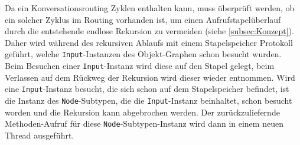 Da ein Konversationsrouting Zyklen enthalten kann, muss überprüft werden, ob ein solcher Zyklus im Routing vorhanden ist, um einen Aufrufstapelüberlauf durch die entstehende endlose Rekursion zu vermeiden (siehe \ref{subsec:Konzept}). Daher wird während des rekursiven Ablaufs mit einem Stapelspeicher Protokoll geführt, welche \texttt{Input}-Instanzen des Objekt-Graphen schon besucht wurden. Beim Besuchen einer \texttt{Input}-Instanz wird diese auf den Stapel gelegt, beim Verlassen auf dem Rückweg der Rekursion wird dieser wieder entnommen. Wird eine \texttt{Input}-Instanz besucht, die sich schon auf dem Stapelspeicher befindet, ist die Instanz des \texttt{Node}-Subtypen, die die \texttt{Input}-Instanz beinhaltet, schon besucht worden und die Rekursion kann abgebrochen werden. Der zurückzuliefernde Methoden-Aufruf für diese \texttt{Node}-Subtypen-Instanz wird dann in einem neuen Thread ausgeführt. 
\newline
